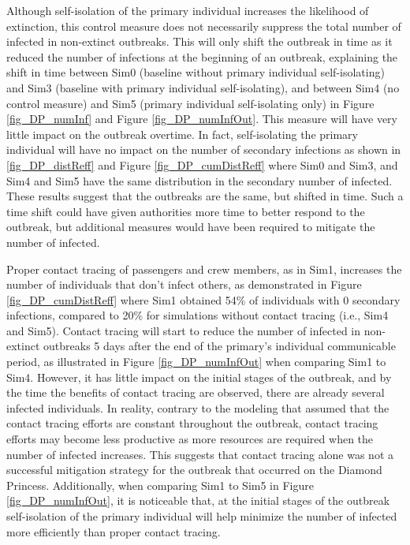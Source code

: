 \documentclass[sr]{drdc-report}
\begin{document}
Although self-isolation of the primary individual increases the likelihood of extinction, this control measure does not necessarily suppress the total number of infected in non-extinct outbreaks. This will only shift the outbreak in time as it reduced the number of infections at the beginning of an outbreak, explaining the shift in time between Sim0 (baseline without primary individual self-isolating) and Sim3 (baseline with primary individual self-isolating), and between Sim4 (no control measure) and Sim5 (primary individual self-isolating only) in Figure \ref{fig_DP_numInf} and Figure \ref{fig_DP_numInfOut}. This measure will have very little impact on the outbreak overtime. In fact, self-isolating the primary individual will have no impact on the number of secondary infections as shown in \ref{fig_DP_distReff} and Figure \ref{fig_DP_cumDistReff} where Sim0 and Sim3, and Sim4 and Sim5 have the same distribution in the secondary number of infected. These results suggest that the outbreaks are the same, but shifted in time. Such a time shift could have given authorities more time to better respond to the outbreak, but additional measures would have been required to mitigate the number of infected. 

Proper contact tracing of passengers and crew members, as in Sim1, increases the number of individuals that don't infect others, as demonstrated in Figure \ref{fig_DP_cumDistReff} where Sim1 obtained 54\% of individuals with 0 secondary infections, compared to 20\% for simulations without contact tracing (i.e., Sim4 and Sim5). Contact tracing will start to reduce the number of infected in non-extinct outbreaks 5 days after the end of the primary's individual communicable period, as illustrated in Figure \ref{fig_DP_numInfOut} when comparing Sim1 to Sim4. However, it has little impact on the initial stages of the outbreak, and by the time the benefits of contact tracing are observed, there are already several infected individuals. In reality, contrary to the modeling that assumed that the contact tracing efforts are constant throughout the outbreak, contact tracing efforts may become less productive as more resources are required when the number of infected increases. This suggests that contact tracing alone was not a successful mitigation strategy for the outbreak that occurred on the Diamond Princess. Additionally, when comparing Sim1 to Sim5 in Figure \ref{fig_DP_numInfOut}, it is noticeable that, at the initial stages of the outbreak self-isolation of the primary individual will help minimize the number of infected more efficiently than proper contact tracing. 
\end{document}
